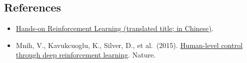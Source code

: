 \FloatBarrier
{}
\hypertarget{references-50}{%
\subsection{References}\label{references-50}}

\vspace{0.25em}
\begin{itemize}
\tightlist
\item
  \href{https://hrl.boyuai.com/}{Hands-on Reinforcement Learning (translated title; in Chinese)}.
\item
  Mnih, V., Kavukcuoglu, K., Silver, D., et al.~(2015). \href{https://www.nature.com/articles/nature14236}{Human-level control through deep reinforcement learning}. Nature.
\end{itemize}

\clearpage

